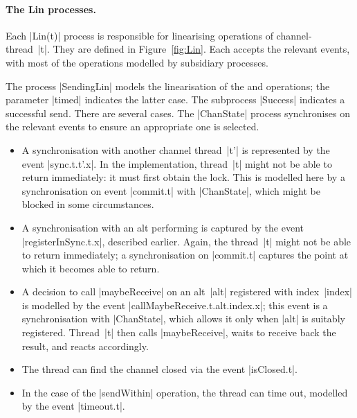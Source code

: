 
\paragraph{The {\cspmstyle Lin} processes.}

Each |Lin(t)| process is responsible for linearising operations of
channel-thread~|t|.  They are defined in Figure~\ref{fig:Lin}.  Each accepts the
relevant  events, with most of the
operations modelled by subsidiary processes.

The process |SendingLin| models the linearisation of the  and
 operations; the parameter |timed| indicates the latter case.
The subprocess |Success| indicates a successful send.  There are several
cases.  The |ChanState| process synchronises on the relevant events to ensure
an appropriate one is selected.
%
\begin{itemize}
\item A synchronisation with another channel thread~|t'| is represented by the
  event |sync.t.t'.x|.  In the implementation, thread~|t| might not be able to
  return immediately: it must first obtain the lock.  This is modelled here by
  a synchronisation on event |commit.t| with |ChanState|, which might be
  blocked in some circumstances.

\item A synchronisation with an alt performing  is captured
  by the event |registerInSync.t.x|, described earlier.  Again, the thread~|t|
  might not be able to return immediately; a synchronisation on |commit.t|
  captures the point at which it becomes able to return.

\item A decision to call |maybeReceive| on an alt~|alt| registered with
  index~|index| is modelled by the event |callMaybeReceive.t.alt.index.x|;
  this event is a synchronisation with |ChanState|, which allows it only when
  |alt| is suitably registered.  Thread~|t| then calls |maybeReceive|, waits
  to receive back the result, and reacts accordingly.

\item The thread can find the channel closed via the event |isClosed.t|.

\item In the case of the |sendWithin| operation, the thread can time out,
  modelled by the event |timeout.t|.  
\end{itemize}

